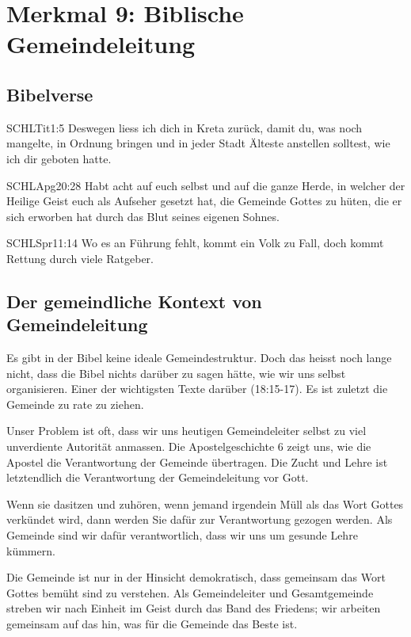 \documentclass{../../inc/mybib}
\begin{document}
\section{Merkmal 9: Biblische Gemeindeleitung}
\subsection{Bibelverse}
\begin{bibelbox}{SCHL}{Tit}{1:5}
    Deswegen liess ich dich in Kreta zurück, damit du, was noch mangelte, in Ordnung bringen und in jeder Stadt Älteste anstellen solltest, wie ich dir geboten hatte.
\end{bibelbox}
\begin{bibelbox}{SCHL}{Apg}{20:28}
    Habt acht auf euch selbst und auf die ganze Herde, in welcher der Heilige Geist euch als Aufseher gesetzt hat, die Gemeinde Gottes zu hüten, die er sich erworben hat durch das Blut seines eigenen Sohnes.
\end{bibelbox}
\begin{bibelbox}{SCHL}{Spr}{11:14}
    Wo es an Führung fehlt, kommt ein Volk zu Fall, doch kommt Rettung durch viele Ratgeber.
\end{bibelbox}
\subsection{Der gemeindliche Kontext von Gemeindeleitung}
Es gibt in der Bibel keine ideale Gemeindestruktur. Doch das heisst noch lange nicht, dass die Bibel nichts darüber zu sagen hätte, wie wir uns selbst organisieren. Einer der wichtigsten Texte darüber (18:15-17). Es ist zuletzt die Gemeinde zu rate zu ziehen.

Unser Problem ist oft, dass wir uns heutigen Gemeindeleiter selbst zu viel unverdiente Autorität anmassen. Die Apostelgeschichte 6 zeigt uns, wie die Apostel die Verantwortung der Gemeinde übertragen. Die Zucht und Lehre ist letztendlich die Verantwortung der Gemeindeleitung vor Gott.

Wenn sie dasitzen und zuhören, wenn jemand irgendein Müll als das Wort Gottes verkündet wird, dann werden Sie dafür zur Verantwortung gezogen werden. Als Gemeinde sind wir dafür verantwortlich, dass wir uns um gesunde Lehre kümmern.

Die Gemeinde ist nur in der Hinsicht demokratisch, dass gemeinsam das Wort Gottes bemüht sind zu verstehen. Als Gemeindeleiter und Gesamtgemeinde streben wir nach Einheit im Geist durch das Band des Friedens; wir arbeiten gemeinsam auf das hin, was für die Gemeinde das Beste ist.
\end{document}
